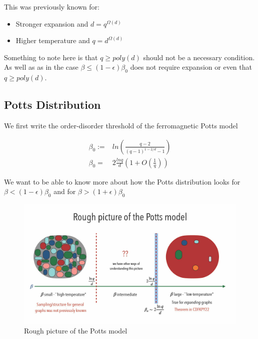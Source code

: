 \documentclass{article}
\begin{document}
\noindent This was previously known for:

\begin{itemize}
    \item Stronger expansion and $d = q^{\Omega(d)}$
    \item Higher temperature and $q = d^{\Omega(d)}$
\end{itemize}

\noindent Something to note here is that $q \geq poly(d)$ should not be a necessary condition.\\

\noindent As well as as in the case $\beta \leq (1-\epsilon) \beta_0$ does not require expansion or even that $q \geq poly(d)$.

\subsection{Potts Distribution}

\noindent We first write the order-disorder threshold of the ferromagnetic Potts model

\begin{equation}
    \begin{split}
    \beta_0 :=& ln(\frac{q-2}{(q-1)^{1-2/d} - 1})\\
    \beta_0 =& 2 \frac{ln q}{d} (1+O(\frac{1}{q}))
    \end{split}
\end{equation}

\noindent We want to be able to know more about how the Potts distribution looks for $\beta < (1-\epsilon)\beta_0$ and for $\beta > (1+\epsilon)\beta_0$

\begin{figure}[h]
\centering
\includegraphics[width=\textwidth]{media/potts-model.jpg}
\caption{Rough picture of the Potts model}
\label{fig:potts-model}
\end{figure}
\end{document}

